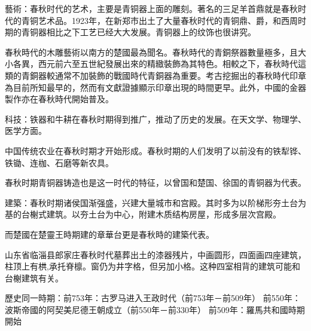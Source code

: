 藝術：春秋时代的艺术，主要是青铜器上面的雕刻。著名的三足羊首鼎就是春秋时代的青铜艺术品。1923年，在新郑市出土了大量春秋时代的青铜鼎、爵，和西周时期的青铜器相比之下工艺已经大大发展。青铜器上的纹饰也很讲究。

春秋時代的木雕藝術以南方的楚國最為聞名。春秋時代的青銅祭器數量極多，且大小各異，西元前六至五世紀發展出來的精緻裝飾為其特色。相較之下，春秋時代這類的青銅器較通常不加裝飾的戰國時代青銅器為重要。考古挖掘出的春秋時代印章為目前所知最早的，然而有文獻證據顯示印章出現的時間更早。此外，中國的金器製作亦在春秋時代開始普及。

科技：铁器和牛耕在春秋时期得到推广，推动了历史的发展。在天文学、物理学、医学方面。

中国传统农业在春秋时期才开始形成。春秋时期的人们发明了以前没有的铁犁铧、铁锄、连枷、石磨等新农具。

春秋时期青铜器铸造也是这一时代的特征，以曾国和楚国、徐国的青铜器为代表。

建築：春秋时期诸侯国渐强盛，兴建大量城市和宫殿。其时多为以阶梯形夯土台为基的台榭式建筑。以夯土台为中心，附建木质结构房屋，形成多层次宫殿。

而楚國在楚靈王時期建的章華台更是春秋時的建築代表。

山东省临淄县郎家庄春秋时代墓葬出土的漆器残片，中画圆形，四面画四座建筑，柱顶上有栱,承托脊檩。窗仍为井字格，但另加小格。这种四室相背的建筑可能和台榭建筑有关。

歷史同一時期：前753年：古罗马进入王政时代（前753年－前509年） 前550年：波斯帝國的阿契美尼德王朝成立（前550年－前330年） 前509年：羅馬共和國時期開始

% 
% 


